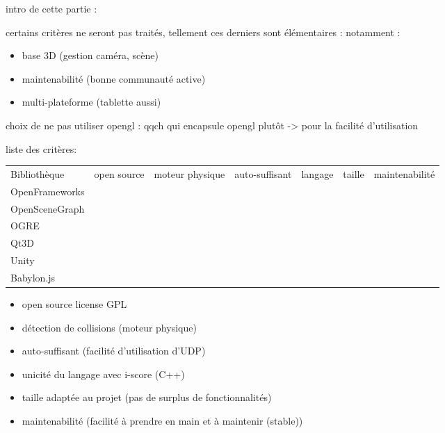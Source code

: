 intro de cette partie :

certains critères ne seront pas traités, tellement ces derniers sont élémentaires :
notamment : 
\begin{itemize}
\item base 3D (gestion caméra, scène)
\item maintenabilité (bonne communauté active)
	\item multi-plateforme (tablette aussi)
\end{itemize}

choix de ne pas utiliser opengl : qqch qui encapsule opengl plutôt -> pour la facilité d'utilisation



liste des critères: \\
\begin{tabular}{l|c|c|c|c|c|c}
\hspace{-2cm}
Bibliothèque & open source & moteur physique & auto-suffisant & langage & taille & maintenabilité \\
OpenFrameworks & & & & & & \\
OpenSceneGraph & & & & & & \\
OGRE & & & & & & \\
Qt3D & & & & & & \\
Unity & & & & & & \\
Babylon.js & & & & & & \\
\end{tabular}
\begin{itemize}

\item open source license GPL
\item détection de collisions (moteur physique)
\item auto-suffisant (facilité d'utilisation d'UDP)
\item unicité du langage avec i-score (C++)
\item taille adaptée au projet (pas de surplus de fonctionnalités)
\item maintenabilité  (facilité à prendre en main et à maintenir (stable))
\end{itemize}